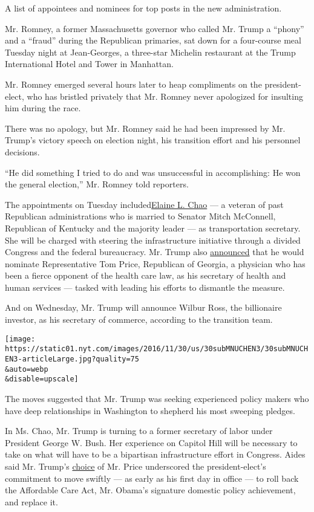 A list of appointees and nominees for top posts in the new
administration.

Mr. Romney, a former Massachusetts governor who called Mr. Trump a
``phony'' and a ``fraud'' during the Republican primaries, sat down for
a four-course meal Tuesday night at Jean-Georges, a three-star Michelin
restaurant at the Trump International Hotel and Tower in Manhattan.

Mr. Romney emerged several hours later to heap compliments on the
president-elect, who has bristled privately that Mr. Romney never
apologized for insulting him during the race.

There was no apology, but Mr. Romney said he had been impressed by Mr.
Trump's victory speech on election night, his transition effort and his
personnel decisions.

``He did something I tried to do and was unsuccessful in accomplishing:
He won the general election,'' Mr. Romney told reporters.

The appointments on Tuesday
included\href{https://www.nytimes.com/2016/11/29/us/politics/elaine-chao-transportation-trump.html}{Elaine
L. Chao} --- a veteran of past Republican administrations who is married
to Senator Mitch McConnell, Republican of Kentucky and the majority
leader --- as transportation secretary. She will be charged with
steering the infrastructure initiative through a divided Congress and
the federal bureaucracy. Mr. Trump also
\href{https://www.nytimes.com/2016/11/28/us/politics/tom-price-secretary-health-and-human-services.html}{announced}
that he would nominate Representative Tom Price, Republican of Georgia,
a physician who has been a fierce opponent of the health care law, as
his secretary of health and human services --- tasked with leading his
efforts to dismantle the measure.

And on Wednesday, Mr. Trump will announce Wilbur Ross, the billionaire
investor, as his secretary of commerce, according to the transition
team.

\texttt{[image: https://static01.nyt.com/images/2016/11/30/us/30subMNUCHEN3/30subMNUCHEN3-articleLarge.jpg?quality=75\\\&auto=webp\\\&disable=upscale]}

The moves suggested that Mr. Trump was seeking experienced policy makers
who have deep relationships in Washington to shepherd his most sweeping
pledges.

In Ms. Chao, Mr. Trump is turning to a former secretary of labor under
President George W. Bush. Her experience on Capitol Hill will be
necessary to take on what will have to be a bipartisan infrastructure
effort in Congress. Aides said Mr. Trump's
\href{http://www.nytimes.com/2016/11/28/us/politics/tom-price-secretary-health-and-human-services.html?rref=collection\%2Fnewseventcollection\%2FThe\%20Trump\%20White\%20House\&action=click\&contentCollection=Politics\&module=Collection\&region=Marginalia\&src=me\&version=newsevent\&pgtype=article}{choice}
of Mr. Price underscored the president-elect's commitment to move
swiftly --- as early as his first day in office --- to roll back the
Affordable Care Act, Mr. Obama's signature domestic policy achievement,
and replace it.

